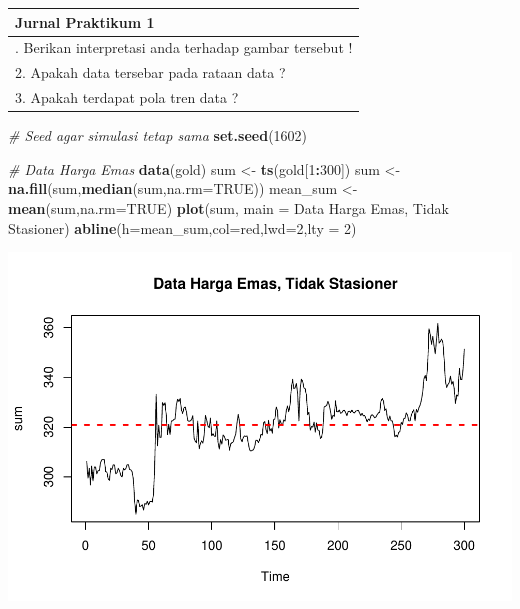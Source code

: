 \documentclass[
]{book}
\newenvironment{Shaded}{\begin{snugshade}}{\end{snugshade}}
\newcommand{\AttributeTok}[1]{\textcolor[rgb]{0.13,0.29,0.53}{#1}}
\newcommand{\CommentTok}[1]{\textcolor[rgb]{0.56,0.35,0.01}{\textit{#1}}}
\newcommand{\ConstantTok}[1]{\textcolor[rgb]{0.56,0.35,0.01}{#1}}
\newcommand{\DecValTok}[1]{\textcolor[rgb]{0.00,0.00,0.81}{#1}}
\newcommand{\FunctionTok}[1]{\textcolor[rgb]{0.13,0.29,0.53}{\textbf{#1}}}
\newcommand{\NormalTok}[1]{#1}
\newcommand{\OtherTok}[1]{\textcolor[rgb]{0.56,0.35,0.01}{#1}}
\newcommand{\SpecialCharTok}[1]{\textcolor[rgb]{0.81,0.36,0.00}{\textbf{#1}}}
\newcommand{\StringTok}[1]{\textcolor[rgb]{0.31,0.60,0.02}{#1}}
\begin{document}
\begin{longtable}[]{@{}l@{}}
\toprule\noalign{}
Jurnal Praktikum 1 \\
\midrule\noalign{}
\endhead
\bottomrule\noalign{}
\endlastfoot
1. Berikan interpretasi anda terhadap gambar tersebut ! \\
2. Apakah data tersebar pada rataan data ? \\
3. Apakah terdapat pola tren data ? \\
\end{longtable}

\begin{Shaded}
\begin{Highlighting}[]
\CommentTok{\# Seed agar simulasi tetap sama}
\FunctionTok{set.seed}\NormalTok{(}\DecValTok{1602}\NormalTok{)}

\CommentTok{\# Data Harga Emas}
\FunctionTok{data}\NormalTok{(gold)}
\NormalTok{sum }\OtherTok{\textless{}{-}} \FunctionTok{ts}\NormalTok{(gold[}\DecValTok{1}\SpecialCharTok{:}\DecValTok{300}\NormalTok{])}
\NormalTok{sum }\OtherTok{\textless{}{-}} \FunctionTok{na.fill}\NormalTok{(sum,}\FunctionTok{median}\NormalTok{(sum,}\AttributeTok{na.rm=}\ConstantTok{TRUE}\NormalTok{))}
\NormalTok{mean\_sum }\OtherTok{\textless{}{-}} \FunctionTok{mean}\NormalTok{(sum,}\AttributeTok{na.rm=}\ConstantTok{TRUE}\NormalTok{)}
\FunctionTok{plot}\NormalTok{(sum, }\AttributeTok{main =} \StringTok{\textquotesingle{}Data Harga Emas, Tidak Stasioner\textquotesingle{}}\NormalTok{)}
\FunctionTok{abline}\NormalTok{(}\AttributeTok{h=}\NormalTok{mean\_sum,}\AttributeTok{col=}\StringTok{\textquotesingle{}red\textquotesingle{}}\NormalTok{,}\AttributeTok{lwd=}\DecValTok{2}\NormalTok{,}\AttributeTok{lty =} \DecValTok{2}\NormalTok{)}
\end{Highlighting}
\end{Shaded}

\begin{center}\includegraphics{_main_files/figure-latex/Contoh Plot yang Stasioner an Tidak Stasioner-1} \end{center}
\end{document}
